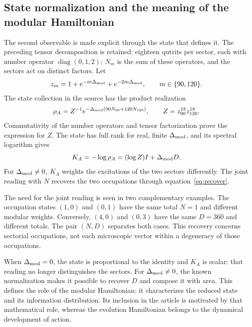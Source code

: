 \subsection{State normalization and the meaning of the modular Hamiltonian}
The second observable is made explicit through the state that defines it.
The preceding tensor decomposition is retained: eighteen qutrits
per sector, each with number operator $\operatorname{diag}(0,1,2)$;
$N_m$ is the sum of these operators, and the sectors act on distinct
factors. Let
\[
 z_m=1+e^{-m\Delta_{\rm mod}}+e^{-2m\Delta_{\rm mod}},
 \qquad m\in\{90,120\}.
\]
The state collection in the source has the product realization
\[
 \rho_A=Z^{-1}e^{-\Delta_{\rm mod}(90N_{90}+120N_{120})},
 \qquad Z=z_{90}^{18}z_{120}^{18}.
\]
Commutativity of the number operators and tensor factorization
prove the expression for $Z$. The state has full rank for real,
finite $\Delta_{\rm mod}$, and its spectral logarithm gives
\[
 K_A=-\log\rho_A=(\log Z)I+\Delta_{\rm mod}D.
\]
For $\Delta_{\rm mod}\ne0$, $K_A$ weights the excitations of the
two sectors differently. The joint reading with $N$ recovers the two occupations
through equation~\eqref{eq:recover}.

The need for the joint reading is seen in two complementary examples.
The occupation states $(1,0)$ and $(0,1)$ have the same total $N=1$
and different modular weights. Conversely, $(4,0)$ and $(0,3)$ have
the same $D=360$ and different totals. The pair $(N,D)$ separates both
cases. This recovery concerns sectorial occupations, not
each microscopic vector within a degeneracy of those occupations.

When $\Delta_{\rm mod}=0$, the state is proportional to the identity
and $K_A$ is scalar: that reading no longer distinguishes the sectors.
For $\Delta_{\rm mod}\ne0$, the known normalization makes it possible to recover
$D$ and compose it with area. This defines the role of the modular
Hamiltonian: it characterizes the reduced state and its information distribution.
Its inclusion in the article is motivated by that mathematical role,
whereas the evolution Hamiltonian belongs to the dynamical development
of action.
